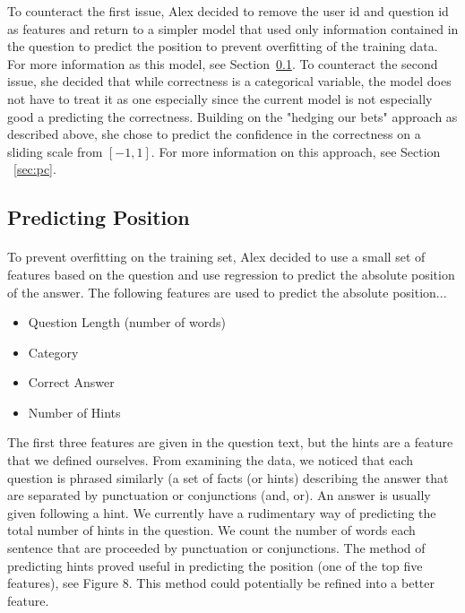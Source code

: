\documentclass[letterpaper]{article}
\begin{document}
To counteract the first issue, Alex decided to remove the user id and question id as features and return to a simpler model that used only information contained in the question to predict the position to prevent overfitting of the training data.  For more information as this model, see Section~\ref{sec:pp}.  To counteract the second issue, she decided that while correctness is a categorical variable, the model does not have to treat it as one especially since the current model is not especially good a predicting the correctness.  Building on the "hedging our bets" approach as described above, she chose to predict the confidence in the correctness on a sliding scale from $[-1,1]$.  For more information on this approach, see Section ~\ref{sec:pc}.

\subsection{Predicting Position}
\label{sec:pp}
\paragraph{}To prevent overfitting on the training set, Alex decided to use a small set of features based on the question and use regression to predict the absolute position of the answer.  The following features are used to predict the absolute position...
\begin{itemize}
\item Question Length (number of words)
\item Category
\item Correct Answer
\item Number of Hints
\end{itemize}
The first three features are given in the question text, but the hints are a feature that we defined ourselves.  From examining the data, we noticed that each question is phrased similarly (a set of facts (or hints) describing the answer that are separated by punctuation or conjunctions (and, or).  An answer is usually given following a hint.  We currently have a rudimentary way of predicting the total number of hints in the question.  We count the number of words each sentence that are proceeded by punctuation or conjunctions.  The method of predicting hints proved useful in predicting the position (one of the top five features), see Figure 8.  This method could potentially be refined into a better feature.

\lstset{
  basicstyle=\itshape
  }
\end{document}

